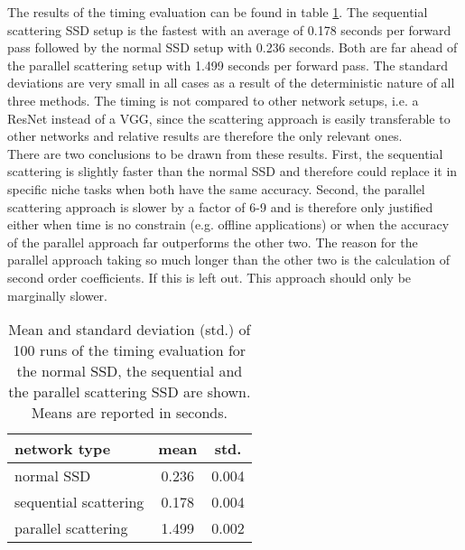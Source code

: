 The results of the timing evaluation can be found in table \ref{table:timing_evaluation}. The sequential scattering SSD setup is the fastest with an average of 0.178 seconds per forward pass followed by the normal SSD setup with 0.236 seconds. Both are far ahead of the parallel scattering setup with 1.499 seconds per forward pass. The standard deviations are very small in all cases as a result of the deterministic nature of all three methods. The timing is not compared to other network setups, i.e. a ResNet instead of a VGG, since the scattering approach is easily transferable to other networks and relative results are therefore the only relevant ones. \\
There are two conclusions to be drawn from these results. First, the sequential scattering is slightly faster than the normal SSD and therefore could replace it in specific niche tasks when both have the same accuracy. Second, the parallel scattering approach is slower by a factor of 6-9 and is therefore only justified either when time is no constrain (e.g. offline applications) or when the accuracy of the parallel approach far outperforms the other two. The reason for the parallel approach taking so much longer than the other two is the calculation of second order coefficients. If this is left out. This approach should only be marginally slower.

\begin{table}[!htb]
	\centering
	\caption{Mean and standard deviation (std.) of 100 runs of the timing evaluation for the normal SSD, the sequential and the parallel scattering SSD are shown. Means are reported in seconds.}
	\begin{tabular}{lcc}
		\toprule
		network type & mean & std. \\
		\midrule
		normal SSD & 0.236 & 0.004 \\
		sequential scattering & 0.178 & 0.004 \\
		parallel scattering & 1.499 & 0.002 \\
		\bottomrule
	\end{tabular}
	\label{table:timing_evaluation}
\end{table}
